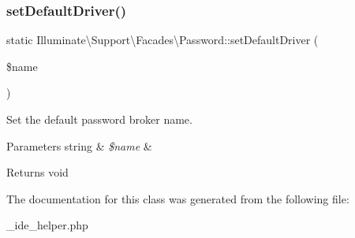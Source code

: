 \subsubsection{\texorpdfstring{set\+Default\+Driver()}{setDefaultDriver()}}
{\footnotesize\ttfamily static Illuminate\textbackslash{}\+Support\textbackslash{}\+Facades\textbackslash{}\+Password\+::set\+Default\+Driver (\begin{DoxyParamCaption}\item[{}]{\$name }\end{DoxyParamCaption})\hspace{0.3cm}{\ttfamily [static]}}

Set the default password broker name.


\begin{DoxyParams}[1]{Parameters}
string & {\em \$name} & \\
\hline
\end{DoxyParams}
\begin{DoxyReturn}{Returns}
void 
\end{DoxyReturn}


The documentation for this class was generated from the following file\+:\begin{DoxyCompactItemize}
\item 
\+\_\+ide\+\_\+helper.\+php\end{DoxyCompactItemize}
